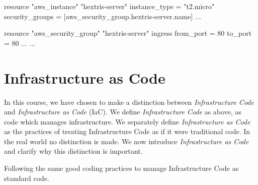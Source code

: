 \begin{code}[language=terraform]{}
resource "aws_instance" "hextris-server" {
    instance_type = "t2.micro"
    security_groups = [aws_security_group.hextris-server.name]
    ...
}

resource "aws_security_group" "hextris-server" {
    ingress {
        from_port = 80
        to_port = 80
        ...
    }
    ...
}
\end{code}

  
  


\section{Infrastructure as Code}

In this course, we have chosen to make a distinction between \textsl{Infrastructure Code} and \textsl{Infrastructure as Code} (IaC).
We define \textsl{Infrastructure Code} as above,
as code which manages infrastructure.
We separately define \textsl{Infrastructure as Code} as the practices of treating Infrastructure Code as if it were traditional code.
In the real world no distinction is made.
We now introduce \textsl{Infrastructure as Code} and clarify why this distinction is important.

\begin{definition}
Following the same good coding practices to manage Infrastructure Code as standard code.
\end{definition}

